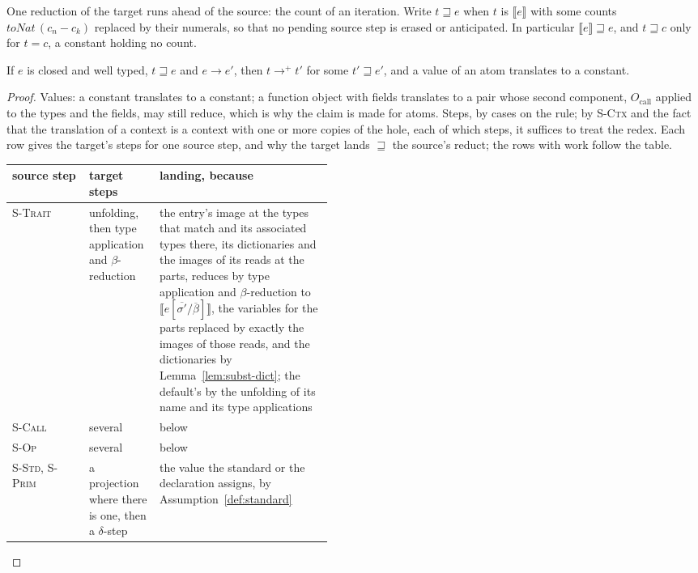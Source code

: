 One reduction of the target runs ahead of the source: the count of an iteration.
Write $t \sqsupseteq e$ when $t$ is $\llbracket e \rrbracket$ with some counts $\mathit{toNat}\,(c_n - c_k)$ replaced by their numerals, so that no pending source step is erased or anticipated.
In particular $\llbracket e \rrbracket \sqsupseteq e$, and $t \sqsupseteq c$ only for $t = c$, a constant holding no count.

\begin{lemma}
\label{lem:forward}
If $e$ is closed and well typed, $t \sqsupseteq e$ and $e \longrightarrow e'$, then $t \longrightarrow^{+} t'$ for some $t' \sqsupseteq e'$, and a value of an atom translates to a constant.
\end{lemma}

\begin{proof}
Values: a constant translates to a constant; a function object with fields translates to a pair whose second component, $O_{\mathrm{call}}$ applied to the types and the fields, may still reduce, which is why the claim is made for atoms.
Steps, by cases on the rule; by \textsc{S-Ctx} and the fact that the translation of a context is a context with one or more copies of the hole, each of which steps, it suffices to treat the redex.
Each row gives the target's steps for one source step, and why the target lands $\sqsupseteq$ the source's reduct; the rows with work follow the table.
\begingroup
\small
\begin{longtable}{@{}>{\raggedright\arraybackslash}p{0.24\linewidth}>{\raggedright\arraybackslash}p{0.22\linewidth}>{\raggedright\arraybackslash}p{}@{}}
\toprule
source step & target steps & landing, because \\
\midrule
\endhead
\bottomrule
\endlastfoot
\textsc{S-Trait} & unfolding, then type application and $\beta$-reduction & the entry's image at the types that match and its associated types there, its dictionaries and the images of its reads at the parts, reduces by type application and $\beta$-reduction to $\llbracket e[\overline{\sigma'}/\overline{\beta}] \rrbracket$, the variables for the parts replaced by exactly the images of those reads, and the dictionaries by Lemma~\ref{lem:subst-dict}; the default's by the unfolding of its name and its type applications \\
\textsc{S-Call} & several & below \\
\textsc{S-Op} & several & below \\
\textsc{S-Std}, \textsc{S-Prim} & a projection where there is one, then a $\delta$-step & the value the standard or the declaration assigns, by Assumption~\ref{def:standard} \\

\end{longtable}
\end{proof}
